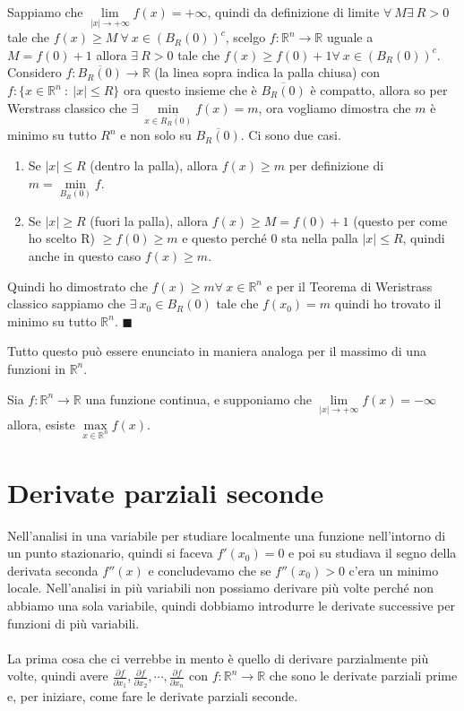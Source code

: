 \begin{demostration}
Sappiamo che $\lim\limits_{|x|\to +\infty}f(x) = +\infty$, quindi da definizione di limite $\forall \: M \exists \: R > 0$ tale che $f(x) \geq M \:\forall \: x \in (B_R(0))^c$, scelgo $f: \mathbb{R}^n \to \mathbb{R}$ uguale a  $M = f(0) + 1$ allora $\exists \: R > 0$ tale che $f(x) \geq f(0) +1 \forall \: x \in (B_R(0))^c$.\\
Considero $f: \overline{B_R(0)} \to \mathbb{R}$ (la linea sopra indica la palla chiusa) con $f: \{x \in \mathbb{R}^n \::\: |x| \leq R\}$ ora questo insieme che è $\overline{B_R(0)}$ è compatto, allora so per Werstrass classico che $\exists \: \min\limits_{x \in \overline{R_R(0)}}f(x) = m$, ora vogliamo dimostra che $m$ è minimo su tutto $R^n$ e non solo su $\overline{B_R(0)}$. Ci sono due casi.
\begin{enumerate}
    \item Se $|x| \leq R$ (dentro la palla), allora $f(x) \geq m$ per definizione di $m = \min\limits_{B_R(0)}f$.
    \item Se $|x| \geq R$ (fuori la palla), allora $f(x) \geq M = f(0) + 1$ (questo per come ho scelto R) $\geq f(0) \geq m$ e questo perché 0 sta nella palla $|x| \leq R$, quindi anche in questo caso $f(x) \geq m$.
\end{enumerate}
Quindi ho dimostrato che $f(x) \geq m \forall \: x \in \mathbb{R}^n$ e per il Teorema di Weristrass classico sappiamo che $\exists \: x_0 \in B_R(0)$ tale che $f(x_0) = m$ quindi ho trovato il minimo su tutto $\mathbb{R}^n$. $\blacksquare$
\end{demostration}

\hspace{-15pt}Tutto questo può essere enunciato in maniera analoga per il massimo di una funzioni in $\mathbb{R}^n$.
\begin{definition}
Sia $f: \mathbb{R}^n \to \mathbb{R}$ una funzione continua, e supponiamo che $\lim\limits_{|x| \to +\infty}f(x) = -\infty$ allora, esiste $\max\limits_{x\in \mathbb{R}^n}f(x)$.
\end{definition}


\section{Derivate parziali seconde}
Nell'analisi in una variabile per studiare localmente una funzione nell'intorno di un punto stazionario, quindi si faceva $f'(x_0) = 0$ e poi su studiava il segno della derivata seconda $f''(x)$ e concludevamo che se $f''(x_0) > 0$ c'era un minimo locale. Nell'analisi in più variabili non possiamo derivare più volte perché non abbiamo una sola variabile, quindi dobbiamo introdurre le derivate successive per funzioni di più variabili.\\\\
La prima cosa che ci verrebbe in mento è quello di derivare parzialmente più volte, quindi avere $\frac{\partial f}{\partial x_1}, \frac{\partial f}{\partial x_2}, \cdots, \frac{\partial f}{\partial x_n}$ con $f: \mathbb{R}^n \to \mathbb{R}$ che sono le derivate parziali prime e, per iniziare, come fare le derivate parziali seconde.


